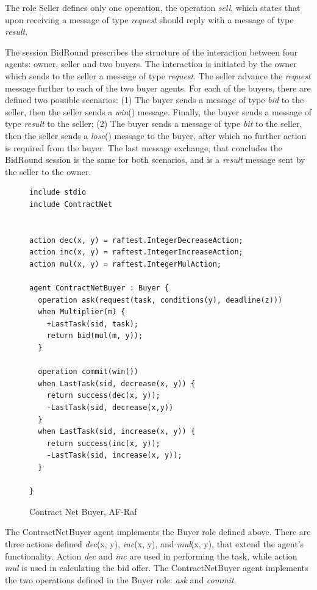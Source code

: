 \documentclass[a4paper,12pt,oneside,fleqn]{book} %
\begin{document}
The role Seller defines only one operation, the operation \textit{sell},
which states that upon receiving a message of type \textit{request} should
reply with a message of type \textit{result}.

The session BidRound prescribes the structure of the interaction between
four agents: owner, seller and two buyers. The interaction is initiated by
the owner which sends to the seller a message of type \textit{request}. The
seller advance the \textit{request} message further to each of the two
buyer agents. For each of the buyers, there are defined two possible
scenarios: (1) The buyer sends a message of type \textit{bid} to the
seller, then the seller sends a \textit{win}() message. Finally, the buyer
sends a message of type \textit{result} to the seller; (2) The buyer sends
a message of type \textit{bit} to the seller, then the seller sends a
\textit{lose}() message to the buyer, after which no further action is
required from the buyer. The last message exchange, that concludes the
BidRound session is the same for both scenarios, and is a \textit{result}
message sent by the seller to the owner.

\begin{figure}\footnotesize %
\begin{verbatim}
include stdio
include ContractNet


action dec(x, y) = raftest.IntegerDecreaseAction;
action inc(x, y) = raftest.IntegerIncreaseAction;
action mul(x, y) = raftest.IntegerMulAction;

agent ContractNetBuyer : Buyer {
  operation ask(request(task, conditions(y), deadline(z)))
  when Multiplier(m) {
    +LastTask(sid, task);
    return bid(mul(m, y));
  }

  operation commit(win())
  when LastTask(sid, decrease(x, y)) {
    return success(dec(x, y));
    -LastTask(sid, decrease(x,y))
  }
  when LastTask(sid, increase(x, y)) {
    return success(inc(x, y));
    -LastTask(sid, increase(x, y));
  }

}
\end{verbatim}
\caption{Contract Net Buyer, AF-Raf}
\label{fig:contract-buyer}
\end{figure} %

The ContractNetBuyer agent implements the Buyer role defined above. There
are three actions defined \textit{dec}(x, y), \textit{inc}(x, y), and
\textit{mul}(x, y), that extend the agent's functionality. Action
\textit{dec} and \textit{inc} are used in performing the task,
while action \textit{mul} is used in calculating the bid offer. The
ContractNetBuyer agent implements the two operations defined in the Buyer
role: \textit{ask} and \textit{commit}.
\end{document}
